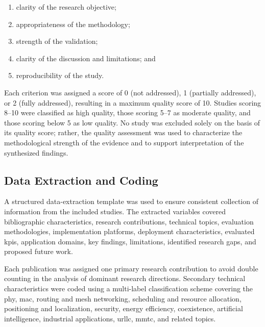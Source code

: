 \begin{enumerate}

    \item clarity of the research objective;

    \item appropriateness of the methodology;

    \item strength of the validation;

    \item clarity of the discussion and limitations; and

    \item reproducibility of the study.

\end{enumerate}

Each criterion was assigned a score of 0 (not addressed), 1 (partially
addressed), or 2 (fully addressed), resulting in a maximum quality score of
10. Studies scoring 8--10 were classified as high quality, those scoring
5--7 as moderate quality, and those scoring below 5 as low quality. No study
was excluded solely on the basis of its quality score; rather, the quality
assessment was used to characterize the methodological strength of the
evidence and to support interpretation of the synthesized findings.

\subsection{Data Extraction and Coding}
\label{subsec:data_extraction}

A structured data-extraction template was used to ensure consistent
collection of information from the included studies. The extracted variables
covered bibliographic characteristics, research contributions, technical
topics, evaluation methodologies, implementation platforms, deployment
characteristics, evaluated \glspl{kpi}, application domains, key findings,
limitations, identified research gaps, and proposed future work.

Each publication was assigned one primary research contribution to avoid
double counting in the analysis of dominant research directions. Secondary
technical characteristics were coded using a multi-label classification
scheme covering the \gls{phy}, \gls{mac}, routing and mesh networking,
scheduling and resource allocation, positioning and localization, security,
energy efficiency, coexistence, artificial intelligence, industrial
applications, \gls{urllc}, \gls{mmtc}, and related topics.

